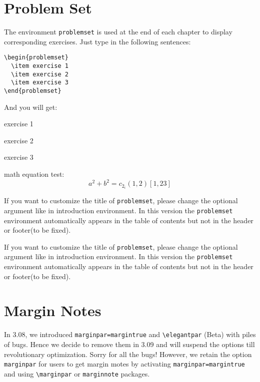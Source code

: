 \documentclass[11pt,fancy,authoryear]{elegantbook}
\begin{document}
\section{Problem Set}
The environment \lstinline{problemset} is used at the end of each chapter to display corresponding exercises. Just type in the following sentences:
\begin{lstlisting}
\begin{problemset}
  \item exercise 1
  \item exercise 2
  \item exercise 3
\end{problemset}
\end{lstlisting}
And you will get:
\begin{problemset}
  \item exercise 1
  \item exercise 2
  \item exercise 3
  \item math equation test:
  \begin{equation}
  a^2+b^2=c_{2_{i}} (1,2) [1,23]
  \end{equation}
\end{problemset}
\begin{remark}
If you want to customize the title of \lstinline{problemset}, please change the optional argument like in introduction environment. In this version the \lstinline{problemset} environment automatically appears in the table of contents but not in the header or footer(to be fixed).
\end{remark}

\begin{solution}
  If you want to customize the title of \lstinline{problemset}, please change the optional argument like in introduction environment. In this version the \lstinline{problemset} environment automatically appears in the table of contents but not in the header or footer(to be fixed).
\end{solution}

\section{Margin Notes}
In 3.08, we introduced \lstinline{marginpar=margintrue} and \lstinline{\elegantpar} (Beta) with piles of bugs. Hence we decide to remove them in 3.09 and will suspend the options till revolutionary optimization. Sorry for all the bugs! However, we retain the option \lstinline{marginpar} for users to get margin motes by activating \lstinline{marginpar=margintrue} and using \lstinline{\marginpar} or \lstinline{marginnote} packages.
\end{document}
